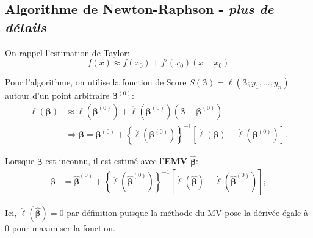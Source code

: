 \documentclass[10pt, french]{article}
\begin{document}
\begin{multicols*}{2}
\section*{Algorithme de Newton-Raphson - \textit{plus de détails}}

On rappel l'estimation de Taylor:
\begin{equation*}
	f(x) \approx f(x_0) + f'(x_0) (x - x_0)
\end{equation*}

Pour l'algorithme, on utilise la fonction de Score $S(\bm{\beta}) = \dot{\ell}(\bm{\beta}; y_1, \dots, y_n)$ autour d'un point arbitraire $\bm{\beta}^{(0)}$:
\begin{align*}
	\dot{\ell}(\bm{\beta}) 
		&\approx \dot{\ell}(\bm{\beta}^{(0)}) + \ddot{\ell}(\bm{\beta}^{(0)}) (\bm{\beta} - \bm{\beta}^{(0)}) \\
		&\Rightarrow	\bm{\beta} = 
			\bm{\beta}^{(0)} + \left\{ \ddot{\ell}(\bm{\beta}^{(0)}) \right\}^{-1}
			\left[
				\dot{\ell}(\bm{\beta}) - \dot{\ell}(\bm{\beta}^{(0)})
			\right].
\end{align*}

Lorsque $\bm{\beta}$ est inconnu, il est estimé avec l'\textbf{EMV} $\bm{\hat{\beta}}$:
\begin{align*}
	\bm{\beta} 
		&=	\bm{\hat{\beta}}^{(0)} + \left\{ \ddot{\ell}(\bm{\hat{\beta}}^{(0)}) \right\}^{-1}
			\left[
				\dot{\ell}(\bm{\hat{\beta}}) - \dot{\ell}(\bm{\hat{\beta}}^{(0)})
			\right];
\end{align*}

Ici, $\dot{\ell}(\bm{\hat{\beta}}) = 0$ par définition puisque la méthode du MV pose la dérivée égale à 0 pour maximiser la fonction.


\end{multicols*}
\end{document}
